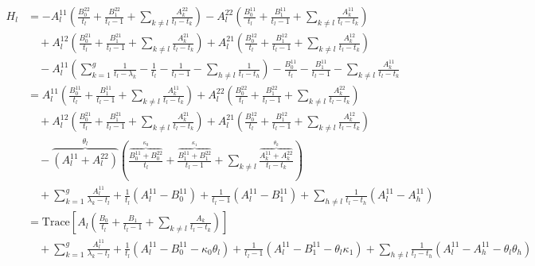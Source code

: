 \documentclass[paper=a4, fontsize=11pt]{jlreq} %
\theoremstyle{break}
\theoremstyle{qa}
\begin{document}
\begin{align*}
    H_l &= -A_l^{11} \left( \frac{B_0^{22}}{t_l} + \frac{B_1^{22}}{t_l-1} + \sum_{k \neq l} \frac{A_k^{22}}{t_l-t_k} \right) - A_l^{22} \left( \frac{B_0^{11}}{t_l} + \frac{B_1^{11}}{t_l-1} + \sum_{k \neq l} \frac{A_k^{11}}{t_l-t_k} \right) \\
    &\quad + A_l^{12} \left( \frac{B_0^{21}}{t_l} + \frac{B_1^{21}}{t_l-1} + \sum_{k \neq l} \frac{A_k^{21}}{t_l-t_k} \right) + A_l^{21} \left( \frac{B_0^{12}}{t_l} + \frac{B_1^{12}}{t_l-1} + \sum_{k \neq l} \frac{A_k^{12}}{t_l-t_k} \right) \\
    &\quad - A_l^{11} \left( \sum_{k=1}^g \frac{1}{t_l-\lambda_k} - \frac{1}{t_l} - \frac{1}{t_l-1} - \sum_{h \neq l} \frac{1}{t_l-t_h} \right) - \frac{B_0^{11}}{t_l} - \frac{B_1^{11}}{t_l-1} - \sum_{k \neq l} \frac{A_k^{11}}{t_l-t_k} \\
    &= A_l^{11} \left( \frac{B_0^{11}}{t_l} + \frac{B_1^{11}}{t_l-1} + \sum_{k \neq l} \frac{A_k^{11}}{t_l-t_k} \right) + A_l^{22} \left( \frac{B_0^{22}}{t_l} + \frac{B_1^{22}}{t_l-1} + \sum_{k \neq l} \frac{A_k^{22}}{t_l-t_k} \right) \\
    &\quad + A_l^{12} \left( \frac{B_0^{21}}{t_l} + \frac{B_1^{21}}{t_l-1} + \sum_{k \neq l} \frac{A_k^{21}}{t_l-t_k} \right) + A_l^{21} \left( \frac{B_0^{12}}{t_l} + \frac{B_1^{12}}{t_l-1} + \sum_{k \neq l} \frac{A_k^{12}}{t_l-t_k} \right) \\
    &\quad - \overbrace{(A_l^{11} + A_l^{22})}^{\theta_l} \left( \frac{\overbrace{B_0^{11} + B_0^{22}}^{\kappa_0}}{t_l} + \frac{\overbrace{B_1^{11} + B_1^{22}}^{\kappa_1}}{t_l-1} + \sum_{k \neq l} \frac{\overbrace{A_k^{11} + A_k^{22}}^{\theta_k}}{t_l-t_k} \right) \\
    &\quad + \sum_{k=1}^g \frac{A_l^{11}}{\lambda_k - t_l} + \frac{1}{t_l} (A_l^{11} - B_0^{11}) + \frac{1}{t_l-1} (A_l^{11} - B_1^{11}) + \sum_{h \neq l} \frac{1}{t_l-t_h} (A_l^{11} - A_h^{11}) \\
    &= \mathrm{Trace}\left[ A_l \left( \frac{B_0}{t_l} + \frac{B_1}{t_l-1} + \sum_{k \neq l} \frac{A_k}{t_l-t_k} \right) \right] \\
    &\quad + \sum_{k=1}^g \frac{A_l^{11}}{\lambda_k - t_l} + \frac{1}{t_l} (A_l^{11} - B_0^{11} - \kappa_0 \theta_l) + \frac{1}{t_l-1} (A_l^{11} - B_1^{11} - \theta_l \kappa_1) + \sum_{h \neq l} \frac{1}{t_l-t_h} (A_l^{11} - A_h^{11} - \theta_l \theta_h)
\end{align*}
\end{document}
